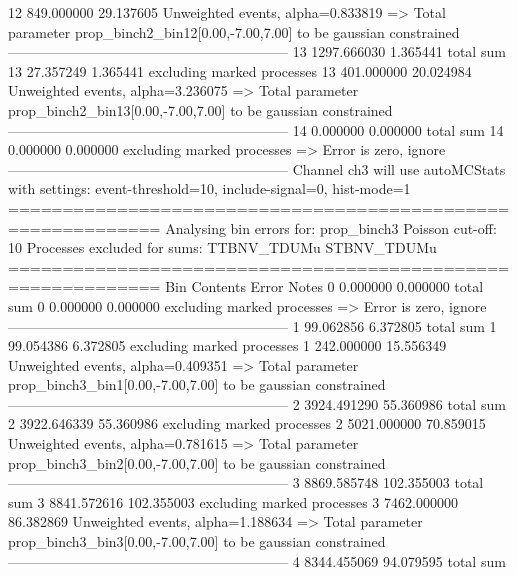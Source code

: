 12         849.000000      29.137605       Unweighted events, alpha=0.833819
  => Total parameter prop_binch2_bin12[0.00,-7.00,7.00] to be gaussian constrained
------------------------------------------------------------
13         1297.666030     1.365441        total sum                     
13         27.357249       1.365441        excluding marked processes    
13         401.000000      20.024984       Unweighted events, alpha=3.236075
  => Total parameter prop_binch2_bin13[0.00,-7.00,7.00] to be gaussian constrained
------------------------------------------------------------
14         0.000000        0.000000        total sum                     
14         0.000000        0.000000        excluding marked processes    
  => Error is zero, ignore      
------------------------------------------------------------
Channel ch3 will use autoMCStats with settings: event-threshold=10, include-signal=0, hist-mode=1
============================================================
Analysing bin errors for: prop_binch3
Poisson cut-off: 10
Processes excluded for sums: TTBNV_TDUMu STBNV_TDUMu
============================================================
Bin        Contents        Error           Notes                         
0          0.000000        0.000000        total sum                     
0          0.000000        0.000000        excluding marked processes    
  => Error is zero, ignore      
------------------------------------------------------------
1          99.062856       6.372805        total sum                     
1          99.054386       6.372805        excluding marked processes    
1          242.000000      15.556349       Unweighted events, alpha=0.409351
  => Total parameter prop_binch3_bin1[0.00,-7.00,7.00] to be gaussian constrained
------------------------------------------------------------
2          3924.491290     55.360986       total sum                     
2          3922.646339     55.360986       excluding marked processes    
2          5021.000000     70.859015       Unweighted events, alpha=0.781615
  => Total parameter prop_binch3_bin2[0.00,-7.00,7.00] to be gaussian constrained
------------------------------------------------------------
3          8869.585748     102.355003      total sum                     
3          8841.572616     102.355003      excluding marked processes    
3          7462.000000     86.382869       Unweighted events, alpha=1.188634
  => Total parameter prop_binch3_bin3[0.00,-7.00,7.00] to be gaussian constrained
------------------------------------------------------------
4          8344.455069     94.079595       total sum                     

